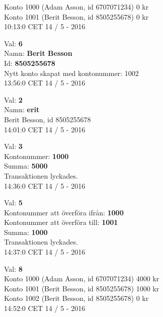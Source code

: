 \begin{multicols}{2}
\begin{exampleblock}
Konto 1000 (Adam Asson, id 6707071234) 0 kr\\
Konto 1001 (Berit Besson, id 8505255678) 0 kr\\
10:13:0 CET 14 / 5 - 2016\\
\end{exampleblock}
\begin{exampleblock}
Val: \textbf{6}\\
Namn: \textbf{Berit Besson}\\
Id: \textbf{8505255678}\\
Nytt konto skapat med kontonummer: 1002\\
13:56:0 CET 14 / 5 - 2016\\
\end{exampleblock}
\begin{exampleblock}
Val: \textbf{2}\\
Namn: \textbf{erit}\\
Berit Besson, id 8505255678\\
14:01:0 CET 14 / 5 - 2016\\
\end{exampleblock}
\begin{exampleblock}
Val: \textbf{3}\\
Kontonummer: \textbf{1000}\\
Summa: \textbf{5000}\\
Transaktionen lyckades.\\
14:36:0 CET 14 / 5 - 2016\\
\end{exampleblock}
\begin{exampleblock}
Val: \textbf{5}\\
Kontonummer att överföra ifrån: \textbf{1000}\\
Kontonummer att överföra till: \textbf{1001}\\
Summa: \textbf{1000}\\
Transaktionen lyckades.\\
14:37:0 CET 14 / 5 - 2016\\
\end{exampleblock}
\begin{exampleblock}
Val: \textbf{8}\\
Konto 1000 (Adam Asson, id 6707071234) 4000 kr\\
Konto 1001 (Berit Besson, id 8505255678) 1000 kr\\
Konto 1002 (Berit Besson, id 8505255678) 0 kr\\
14:52:0 CET 14 / 5 - 2016\\
\end{exampleblock}

\end{multicols}
